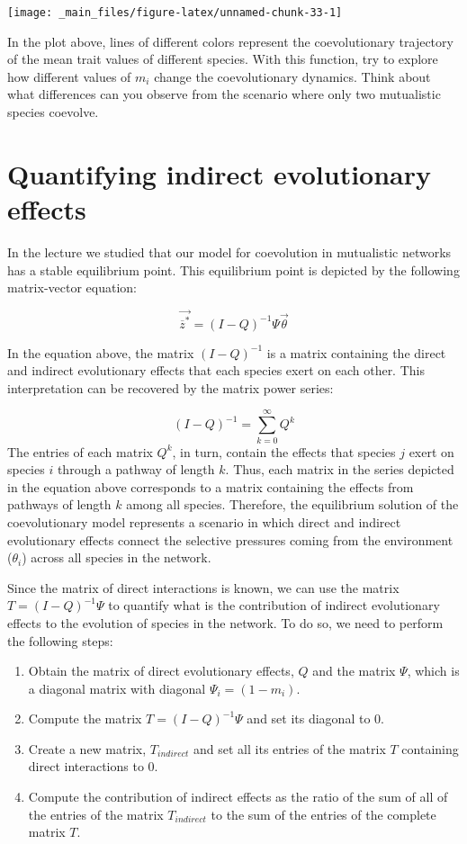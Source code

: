 \documentclass[
]{book}
\begin{document}
\texttt{[image: \_main\_files/figure-latex/unnamed-chunk-33-1]}

In the plot above, lines of different colors represent the coevolutionary trajectory of the mean trait values of different species. With this function, try to explore how different values of \(m_{i}\) change the coevolutionary dynamics. Think about what differences can you observe from the scenario where only two mutualistic species coevolve.

\hypertarget{quantifying-indirect-evolutionary-effects}{%
\section{Quantifying indirect evolutionary effects}\label{quantifying-indirect-evolutionary-effects}}

In the lecture we studied that our model for coevolution in mutualistic networks has a stable equilibrium point. This equilibrium point is depicted by the following matrix-vector equation:

\[
\vec{\overline{z}^*}=(I-Q)^{-1}\Psi\vec{\theta}
\]

In the equation above, the matrix \(\left(I-Q\right)^{-1}\) is a matrix containing the direct and indirect evolutionary effects that each species exert on each other. This interpretation can be recovered by the matrix power series:

\[
\left(I-Q\right)^{-1}=\sum_{k=0}^{\infty}Q^{k}
\] The entries of each matrix \(Q^{k}\), in turn, contain the effects that species \(j\) exert on species \(i\) through a pathway of length \(k\). Thus, each matrix in the series depicted in the equation above corresponds to a matrix containing the effects from pathways of length \(k\) among all species. Therefore, the equilibrium solution of the coevolutionary model represents a scenario in which direct and indirect evolutionary effects connect the selective pressures coming from the environment (\(\theta_{i}\)) across all species in the network.

Since the matrix of direct interactions is known, we can use the matrix \(T=(I-Q)^{-1}\Psi\) to quantify what is the contribution of indirect evolutionary effects to the evolution of species in the network. To do so, we need to perform the following steps:

\begin{enumerate}
\def\labelenumi{\arabic{enumi}.}
\item
  Obtain the matrix of direct evolutionary effects, \(Q\) and the matrix \(\Psi\), which is a diagonal matrix with diagonal \(\Psi_{i}=(1-m_{i})\).
\item
  Compute the matrix \(T=(I-Q)^{-1}\Psi\) and set its diagonal to 0.
\item
  Create a new matrix, \(T_{indirect}\) and set all its entries of the matrix \(T\) containing direct interactions to 0.
\item
  Compute the contribution of indirect effects as the ratio of the sum of all of the entries of the matrix \(T_{indirect}\) to the sum of the entries of the complete matrix \(T\).
\end{enumerate}
\end{document}
